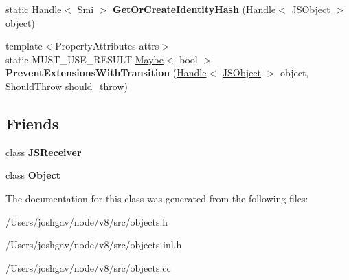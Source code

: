 \begin{DoxyCompactItemize}
\item 
static \hyperlink{classv8_1_1internal_1_1_handle}{Handle}$<$ \hyperlink{classv8_1_1internal_1_1_smi}{Smi} $>$ {\bfseries Get\+Or\+Create\+Identity\+Hash} (\hyperlink{classv8_1_1internal_1_1_handle}{Handle}$<$ \hyperlink{classv8_1_1internal_1_1_j_s_object}{J\+S\+Object} $>$ object)\hypertarget{classv8_1_1internal_1_1_j_s_object_aec39529113d4f3fdd043a0ac1084a3a2}{}\label{classv8_1_1internal_1_1_j_s_object_aec39529113d4f3fdd043a0ac1084a3a2}

\item 
{\footnotesize template$<$Property\+Attributes attrs$>$ }\\static M\+U\+S\+T\+\_\+\+U\+S\+E\+\_\+\+R\+E\+S\+U\+LT \hyperlink{classv8_1_1_maybe}{Maybe}$<$ bool $>$ {\bfseries Prevent\+Extensions\+With\+Transition} (\hyperlink{classv8_1_1internal_1_1_handle}{Handle}$<$ \hyperlink{classv8_1_1internal_1_1_j_s_object}{J\+S\+Object} $>$ object, Should\+Throw should\+\_\+throw)\hypertarget{classv8_1_1internal_1_1_j_s_object_a6d419cc317105faf2cf4dfffa9799daa}{}\label{classv8_1_1internal_1_1_j_s_object_a6d419cc317105faf2cf4dfffa9799daa}

\end{DoxyCompactItemize}
\subsection*{Friends}
\begin{DoxyCompactItemize}
\item 
class {\bfseries J\+S\+Receiver}\hypertarget{classv8_1_1internal_1_1_j_s_object_a52a8ab6293af62038e1f16e7f27701f2}{}\label{classv8_1_1internal_1_1_j_s_object_a52a8ab6293af62038e1f16e7f27701f2}

\item 
class {\bfseries Object}\hypertarget{classv8_1_1internal_1_1_j_s_object_a0720b5f434e636e22a3ed34f847eec57}{}\label{classv8_1_1internal_1_1_j_s_object_a0720b5f434e636e22a3ed34f847eec57}

\end{DoxyCompactItemize}


The documentation for this class was generated from the following files\+:\begin{DoxyCompactItemize}
\item 
/\+Users/joshgav/node/v8/src/objects.\+h\item 
/\+Users/joshgav/node/v8/src/objects-\/inl.\+h\item 
/\+Users/joshgav/node/v8/src/objects.\+cc\end{DoxyCompactItemize}
